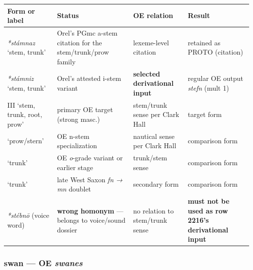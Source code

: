 \documentclass[
  british,
  a4paper,
]{article}
\newcounter{none} %
\providecommand{\Recon}[1]{\emph{*#1}}
\begin{document}
{\def\LTcaptype{none} %
\begin{longtable}[]{@{}
  >{\raggedright\arraybackslash}p{}
  >{\raggedright\arraybackslash}p{}
  >{\raggedright\arraybackslash}p{}
  >{\raggedright\arraybackslash}p{}@{}}
\toprule\noalign{}
\begin{minipage}[b]{\linewidth}\raggedright
Form or label
\end{minipage} & \begin{minipage}[b]{\linewidth}\raggedright
Status
\end{minipage} & \begin{minipage}[b]{\linewidth}\raggedright
OE relation
\end{minipage} & \begin{minipage}[b]{\linewidth}\raggedright
Result
\end{minipage} \\
\midrule\noalign{}
\endhead
\bottomrule\noalign{}
\endlastfoot
\Recon{stámnaz} `stem, trunk' & Orel's PGmc a-stem citation for the
stem/trunk/prow family & lexeme-level citation & retained as PROTO
(citation) \\
\Recon{stámniz} `stem, trunk' & Orel's attested i-stem variant &
\textbf{selected derivational input} & regular OE output \emph{stefn}
(mult 1) \\
{\emph{stefn}} III `stem, trunk, root, prow' & primary OE target (strong
masc.) & stem/trunk sense per Clark Hall & target form \\
{\emph{stefna}} `prow/stern' & OE n-stem specialization & nautical sense
per Clark Hall & comparison form \\
{\emph{stofn}} `trunk' & OE \emph{o}-grade variant or earlier stage &
trunk/stem sense & comparison form \\
{\emph{stemn}} `trunk' & late West Saxon \emph{fn → mn} doublet &
secondary form & comparison form \\
\emph{*stébnō} (voice word) & \textbf{wrong homonym} --- belongs to
voice/sound dossier & no relation to stem/trunk sense & \textbf{must not
be used as row 2216's derivational input} \\
\end{longtable}
}

\subsubsection{\texorpdfstring{swan --- OE
\emph{swanes}}{swan --- OE swanes}}\label{swan-oe-swanes}
\end{document}

